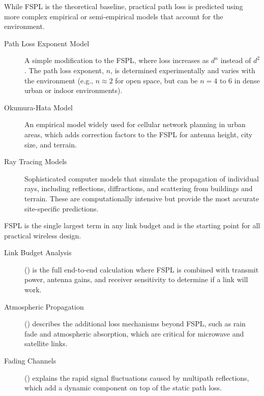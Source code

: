 While FSPL is the theoretical baseline, practical path loss is predicted using more complex empirical or semi-empirical models that account for the environment.
\begin{description}
    \item[Path Loss Exponent Model] A simple modification to the FSPL, where loss increases as $d^n$ instead of $d^2$. The path loss exponent, $n$, is determined experimentally and varies with the environment (e.g., $n \approx 2$ for open space, but can be $n=4$ to $6$ in dense urban or indoor environments).
    \item[Okumura-Hata Model] An empirical model widely used for cellular network planning in urban areas, which adds correction factors to the FSPL for antenna height, city size, and terrain.
    \item[Ray Tracing Models] Sophisticated computer models that simulate the propagation of individual rays, including reflections, diffractions, and scattering from buildings and terrain. These are computationally intensive but provide the most accurate site-specific predictions.
\end{description}


\begin{importantbox}[title={Further Reading}]
    FSPL is the single largest term in any link budget and is the starting point for all practical wireless design.
    \begin{description}
        \item[Link Budget Analysis] () is the full end-to-end calculation where FSPL is combined with transmit power, antenna gains, and receiver sensitivity to determine if a link will work.
        \item[Atmospheric Propagation] () describes the additional loss mechanisms beyond FSPL, such as rain fade and atmospheric absorption, which are critical for microwave and satellite links.
        \item[Fading Channels] () explains the rapid signal fluctuations caused by multipath reflections, which add a dynamic component on top of the static path loss.
    \end{description}
\end{importantbox}